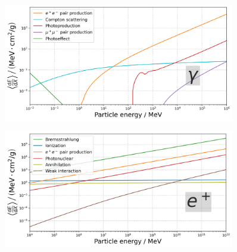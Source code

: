 \begin{frame}
\begin{columns}[onlytextwidth]
\begin{column}{0.55\textwidth}
    \begin{figure}
    	\centering
        \includegraphics[width=0.9\textwidth]{plots/photon_dEdx.png}
    \end{figure}
    \vspace{-3mm}
    \begin{figure}
        \centering
        \includegraphics[width=0.9\textwidth]{plots/positron_dEdx.png}
    \end{figure}

    \end{column}
\end{columns}

\end{frame}



